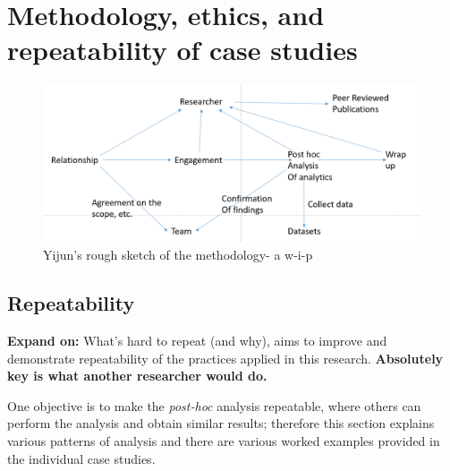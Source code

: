 \section{Methodology, ethics, and repeatability of case studies} \label{section-methodology-ethics-and-repeatability-of-case-studies}

\begin{figure}
    \centering
    \includegraphics[width=14cm]{images/rough-sketches/Yijun-rough-sketch-of-relationships-in-case-study-methodology.png}
    \caption{Yijun's rough sketch of the methodology- a w-i-p}
    \label{fig:yijun-methodology-sketch}
\end{figure}




\subsection{Repeatability}
\textbf{Expand on:} What's hard to repeat (and why), aims to improve and demonstrate repeatability of the practices applied in this research.
\textbf{Absolutely key is what another researcher would do.}

One objective is to make the \emph{post-hoc} analysis repeatable, where others can perform the analysis and obtain similar results; therefore this section explains various patterns of analysis and there are various worked examples provided in the individual case studies.

